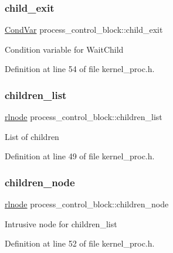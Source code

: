 \subsubsection{\texorpdfstring{child\+\_\+exit}{child\_exit}}
{\footnotesize\ttfamily \hyperlink{structCondVar}{Cond\+Var} process\+\_\+control\+\_\+block\+::child\+\_\+exit}

Condition variable for {\ttfamily Wait\+Child} 

Definition at line 54 of file kernel\+\_\+proc.\+h.

\mbox{\label{structprocess__control__block_a79b0dd70bbfff1d7da6ab4cbbd00eb1f}} 
\subsubsection{\texorpdfstring{children\+\_\+list}{children\_list}}
{\footnotesize\ttfamily \hyperlink{group__rlists_ga8f6244877f7ce2322c90525217ea6e7a}{rlnode} process\+\_\+control\+\_\+block\+::children\+\_\+list}

List of children 

Definition at line 49 of file kernel\+\_\+proc.\+h.

\mbox{\label{structprocess__control__block_a5b9aeabcc3d676cda39eb563a4cc5bd9}} 
\subsubsection{\texorpdfstring{children\+\_\+node}{children\_node}}
{\footnotesize\ttfamily \hyperlink{group__rlists_ga8f6244877f7ce2322c90525217ea6e7a}{rlnode} process\+\_\+control\+\_\+block\+::children\+\_\+node}

Intrusive node for {\ttfamily children\+\_\+list} 

Definition at line 52 of file kernel\+\_\+proc.\+h.

\mbox{\label{structprocess__control__block_afddb936103b136214462e1ed870c4c70}} 
